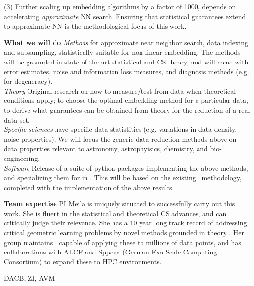 \documentclass[floatfix,11pt]{article}
\begin{document}
(3) Further scaling up embedding algorithms by a factor of 1000, depends on accelerating {\em approximate} NN search. Ensuring that statistical guarantees extend to approximate NN is the methodological focus of this work.


\textbf{What we will do}
 {\em Methods} for approximate near neighbor search, data indexing and subsampling, statistically suitable for non-linear embedding. The methods will be grounded in state of the art statistical and CS theory, and will come with error estimates, noise and information loss measures, and diagnosis methods (e.g. for degeneracy).\\
{\em Theory}  Original research on how to measure/test from data when theoretical conditions apply; to choose the optimal embedding method for a particular data, to derive what guarantees can be obtained from theory for the reduction of a real data set.
 \\
{\em Specific sciences} have specific data statistitics (e.g. variations in data density, noise properties). We will focus the generic data reduction methods above on data properties relevant to astronomy, astrophyisics, chemistry, and bio-engineering.\\
{\em Software} Release of a suite of python packages implementing the above methods, and specializing them for  in . This will be based on the existing \mmani~methodology, completed with the implementation of the above results.

\underline{\bf Team expertise} %
PI Meila is uniquely situated to successfully carry out this work. She is fluent in the statistical and theoretical CS advances, and can critically judge their relevance. She has a 10 year long track record of addressing critical geometric learning problems by novel methods grounded in theory \citep{2013arXiv1305.7255P,}. Her group maintains \mmani, capable of applying these to millions of data points, and has collaborations with ALCF and Sppexa (German Exa Scale Computing Consortium) to expand these to HPC environments.

DACB, ZI, AVM
\end{document}
